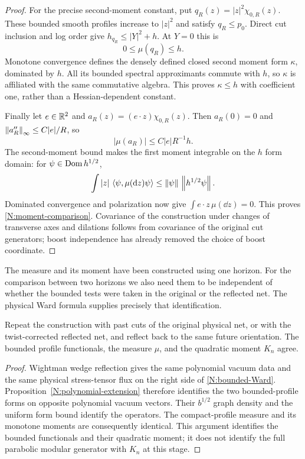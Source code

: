 \begin{proof}
For the precise second-moment constant, put
$q_R(z)=|z|^2\chi_{0,R}(z)$.  These bounded smooth profiles increase
to $|z|^2$ and satisfy $q_R\leq p_0$.  Direct cut inclusion and log
order give $h_{q_R}\leq |Y|^2+h$.  At $Y=0$ this is
\[
 0\leq\mu(q_R)\leq h.
\]
Monotone convergence defines the densely defined closed second
moment form $\kappa$, dominated by $h$.  All its bounded spectral
approximants commute with $h$, so $\kappa$ is affiliated with the
same commutative algebra.  This proves $\kappa\leq h$ with coefficient
one, rather than a Hessian-dependent constant.

Finally let $e\in\mathbb R^2$ and
$a_R(z)=(e\cdot z)\chi_{0,R}(z)$.  Then $a_R(0)=0$ and
$\left\lVert a_R''\right\rVert_\infty\leq C|e|/R$, so
\[
 |\mu(a_R)|\leq C|e|R^{-1}h.
\]
The second-moment bound makes the first moment integrable on the
$h$ form domain: for $\psi\in\operatorname{Dom} h^{1/2}$,
\[
 \int|z|\,\left\langle\psi,\mu(\mathrm d z)\psi\right\rangle
 \leq\left\lVert\psi\right\rVert\,\left\lVert h^{1/2}\psi\right\rVert.
\]
Dominated convergence and polarization now give
$\int e\cdot z\,\mu(\dd z)=0$.  This proves
\eqref{N:moment-comparison}.  Covariance of the construction under
changes of transverse axes and dilations follows from covariance
of the original cut generators; boost independence has already
removed the choice of boost coordinate.
\end{proof}

The measure and its moment have been constructed using one horizon.
For the comparison between two horizons we also need them to be
independent of whether the bounded tests were taken in the original
or the reflected net. The physical Ward formula supplies precisely
that identification.

\begin{corollary}\label{N:reflected-agreement}
Repeat the construction with past cuts of the original physical
net, or with the twist-corrected reflected net, and reflect back
to the same future orientation.  The bounded profile functionals,
the measure $\mu$, and the quadratic moment $K_n$ agree.
\end{corollary}

\begin{proof}
Wightman wedge reflection gives the same polynomial vacuum data
and the same physical stress-tensor flux on the right side of
\eqref{N:bounded-Ward}.  Proposition~\ref{N:polynomial-extension}
therefore identifies the two bounded-profile forms on opposite
polynomial vacuum vectors.  Their $b^{1/2}$ graph density and the
uniform form bound identify the operators.  The compact-profile
measure and its monotone moments are consequently identical.
This argument identifies the bounded functionals and their
quadratic moment; it does not identify the full parabolic modular
generator with $K_n$ at this stage.
\end{proof}
